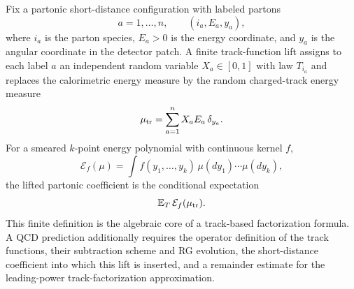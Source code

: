 \begin{definition}
\label{def:finite-track-observable-lift}
Fix a partonic short-distance configuration with labeled partons
\[
  a=1,\ldots,n,\qquad (i_a,E_a,y_a),
\]
where \(i_a\) is the parton species, \(E_a>0\) is the energy coordinate, and
\(y_a\) is the angular coordinate in the detector patch.  A finite
track-function lift assigns to each label \(a\) an independent random variable
\(X_a\in[0,1]\) with law \(T_{i_a}\) and replaces the calorimetric energy
measure by the random charged-track energy measure
\[
  \mu_{\rm tr}
  =
  \sum_{a=1}^n X_a E_a\,\delta_{y_a}.
\]
For a smeared \(k\)-point energy polynomial with continuous kernel \(f\),
\[
  \mathcal E_f(\mu)
  =
  \int f(y_1,\ldots,y_k)\,\mu(dy_1)\cdots\mu(dy_k),
\]
the lifted partonic coefficient is the conditional expectation
\[
  \mathbb E_T\,\mathcal E_f(\mu_{\rm tr}).
\]
This finite definition is the algebraic core of a track-based factorization
formula.  A QCD prediction additionally requires the operator definition of
the track functions, their subtraction scheme and RG evolution, the
short-distance coefficient into which this lift is inserted, and a remainder
estimate for the leading-power track-factorization approximation.
\end{definition}


